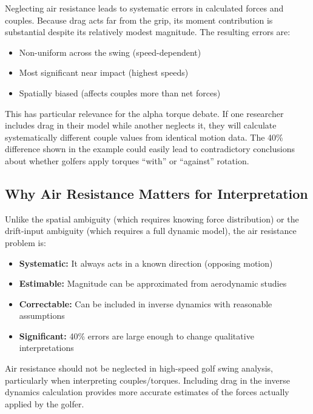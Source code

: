 \documentclass[11pt,a4paper]{article}
\theoremstyle{definition}
\theoremstyle{plain}
\begin{document}
\begin{limitation}[title=Air Resistance Ambiguity]
Neglecting air resistance leads to systematic errors in calculated forces and couples. Because drag acts far from the grip, its moment contribution is substantial despite its relatively modest magnitude. The resulting errors are:
\begin{itemize}
    \item Non-uniform across the swing (speed-dependent)
    \item Most significant near impact (highest speeds)
    \item Spatially biased (affects couples more than net forces)
\end{itemize}
\end{limitation}

This has particular relevance for the alpha torque debate. If one researcher includes drag in their model while another neglects it, they will calculate systematically different couple values from identical motion data. The 40\% difference shown in the example could easily lead to contradictory conclusions about whether golfers apply torques ``with'' or ``against'' rotation.

\subsection{Why Air Resistance Matters for Interpretation}

Unlike the spatial ambiguity (which requires knowing force distribution) or the drift-input ambiguity (which requires a full dynamic model), the air resistance problem is:

\begin{itemize}
    \item \textbf{Systematic:} It always acts in a known direction (opposing motion)
    \item \textbf{Estimable:} Magnitude can be approximated from aerodynamic studies
    \item \textbf{Correctable:} Can be included in inverse dynamics with reasonable assumptions
    \item \textbf{Significant:} 40\% errors are large enough to change qualitative interpretations
\end{itemize}

\begin{keypoint}
Air resistance should not be neglected in high-speed golf swing analysis, particularly when interpreting couples/torques. Including drag in the inverse dynamics calculation provides more accurate estimates of the forces actually applied by the golfer.
\end{keypoint}
\end{document}
